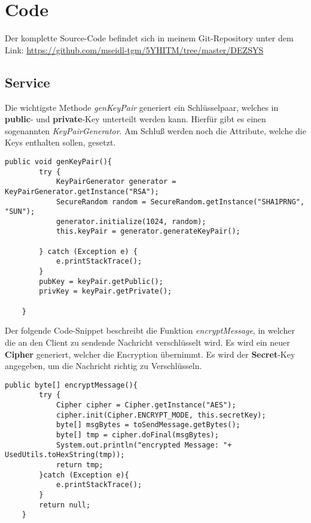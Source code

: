 \section{Code}

Der komplette Source-Code befindet sich in meinem Git-Repository unter dem Link:
\url{https://github.com/mseidl-tgm/5YHITM/tree/master/DEZSYS}

\newpage
\subsection{Service}

Die wichtigste Methode \textit{genKeyPair} generiert ein Schlüsselpaar, welches in \textbf{public}- und \textbf{private}-Key unterteilt werden kann.
Hierfür gibt es einen sogenannten \textit{KeyPairGenerator}. Am Schluß werden noch die Attribute, welche die Keys enthalten sollen, gesetzt.

\begin{lstlisting}[style=Java, caption= RSA KeyPair generation]
    public void genKeyPair(){
	    try {
		    KeyPairGenerator generator = KeyPairGenerator.getInstance("RSA");
		    SecureRandom random = SecureRandom.getInstance("SHA1PRNG", "SUN");
		    generator.initialize(1024, random);
			this.keyPair = generator.generateKeyPair();
    
	    } catch (Exception e) {
		    e.printStackTrace();
	    }
	    pubKey = keyPair.getPublic();
	    privKey = keyPair.getPrivate();
    
    }

\end{lstlisting}

Der folgende Code-Snippet beschreibt die Funktion \textit{encryptMessage}, in welcher die an den Client zu sendende Nachricht verschlüsselt wird.
Es wird ein neuer \textbf{Cipher} generiert, welcher die Encryption übernimmt. Es wird der \textbf{Secret}-Key angegeben, um die Nachricht richtig zu
Verschlüsseln.
\newline

\begin{lstlisting}[style=Java, caption= Message encrypting]
	public byte[] encryptMessage(){
		try {
			Cipher cipher = Cipher.getInstance("AES");
			cipher.init(Cipher.ENCRYPT_MODE, this.secretKey);
			byte[] msgBytes = toSendMessage.getBytes();
			byte[] tmp = cipher.doFinal(msgBytes);
			System.out.println("encrypted Message: "+ UsedUtils.toHexString(tmp));
			return tmp;
		}catch (Exception e){
			e.printStackTrace();
		}
		return null;
	}
\end{lstlisting}

